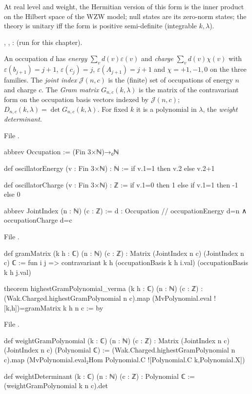 \begin{physics}
At real level and weight, the Hermitian version of this form is the inner product on the Hilbert space
of the WZW model; null states are its zero-norm states; the theory is unitary iff the form is positive
semi-definite (integrable $k,\lambda$).
\end{physics}

\begin{status}
\allowbreak{}, , : \lean{[propext,
Classical.}\allowbreak{}\allowbreak\lean{sound]} (run for this chapter).
\end{status}

\begin{definition}\label{l08:def:gram}
An occupation $d$ has \emph{energy} $\sum_v d(v)\varepsilon(v)$ and \emph{charge} $\sum_v d(v)\chi(v)$ with
$\varepsilon(b_{j+1}) = j+1$, $\varepsilon(c_j) = j$, $\varepsilon(A_{j+1}) = j+1$ and $\chi = +1,-1,0$ on the three
families. The \emph{joint index} $\mathcal J(n,c)$ is the (finite) set of occupations of energy $n$ and charge
$c$. The \emph{Gram matrix} $G_{n,c}(k,\lambda)$ is the matrix of the contravariant form on the occupation
basis vectors indexed by $\mathcal J(n,c)$; $D_{n,c}(k,\lambda) = \det G_{n,c}(k,\lambda)$. For fixed $k$ it is a
polynomial in $\lambda$, the \emph{weight determinant}.
\end{definition}

\noindent File .
\begin{leancode}
abbrev Occupation := (Fin 3×ℕ)→₀ℕ

def oscillatorEnergy (v : Fin 3×ℕ) : ℕ := if v.1=1 then v.2 else v.2+1

def oscillatorCharge (v : Fin 3×ℕ) : ℤ := if v.1=0 then 1 else if v.1=1 then -1 else 0

abbrev JointIndex (n : ℕ) (c : ℤ) :=
  {d : Occupation // occupationEnergy d=n ∧ occupationCharge d=c}
\end{leancode}
\noindent File .
\begin{leancode}
def gramMatrix (k h : ℂ) (n : ℕ) (c : ℤ) : Matrix (JointIndex n c) (JointIndex n c) ℂ :=
  fun i j => contravariant k h (occupationBasis k h i.val) (occupationBasis k h j.val)

theorem highestGramPolynomial_verma (k h : ℂ) (n : ℕ) (c : ℤ) :
    (Wak.Charged.highestGramPolynomial n c).map (MvPolynomial.eval ![k,h])=gramMatrix k h n c := by
\end{leancode}
\noindent File .
\begin{leancode}
def weightGramPolynomial (k : ℂ) (n : ℕ) (c : ℤ) :
    Matrix (JointIndex n c) (JointIndex n c) (Polynomial ℂ) :=
  (Wak.Charged.highestGramPolynomial n c).map
    (MvPolynomial.eval₂Hom Polynomial.C ![Polynomial.C k,Polynomial.X])

def weightDeterminant (k : ℂ) (n : ℕ) (c : ℤ) : Polynomial ℂ :=
  (weightGramPolynomial k n c).det
\end{leancode}

